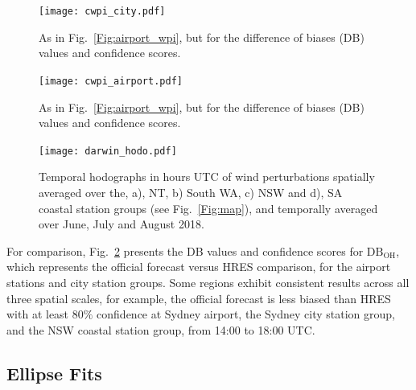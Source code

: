 \documentclass[twocol]{ametsoc}
\begin{document}
\begin{figure}
\centering
\texttt{[image: cwpi\_city.pdf]}
\caption{As in Fig.~\ref{Fig:airport_wpi}, but for the difference of biases (DB) values and confidence scores.}
\label{Fig:airport_cwpi}
\end{figure}

\begin{figure}
\centering
\texttt{[image: cwpi\_airport.pdf]}
\caption{As in Fig.~\ref{Fig:airport_wpi}, but for the difference of biases (DB) values and confidence scores.}
\label{Fig:airport_cwpi}
\end{figure}

\begin{figure}
\centering
\texttt{[image: darwin\_hodo.pdf]}
\caption{Temporal hodographs in hours UTC of wind perturbations spatially averaged over the, a), NT, b) South WA, c) NSW and d), SA coastal station groups (see Fig.~\ref{Fig:map}), and temporally averaged over June, July and August 2018.}
\label{Fig:clim_hodo}
\end{figure}

For comparison, Fig.~\ref{Fig:airport_cwpi} presents the DB values and confidence scores for $\text{DB}_\text{OH}$, which represents the official forecast versus HRES comparison, for the airport stations and city station groups. Some regions exhibit consistent results across all three spatial scales, for example, the official forecast is less biased than HRES with at least $80 \%$ confidence at Sydney airport, the Sydney city station group, and the NSW coastal station group, from 14:00 to 18:00 UTC.  

\subsection{Ellipse Fits}
\end{document}
